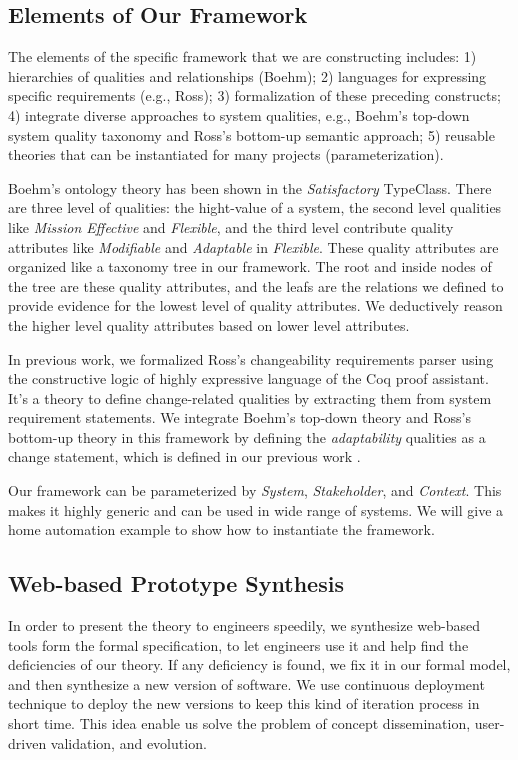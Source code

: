 \documentclass[conference]{IEEEtran}
\begin{document}
\subsection{Elements of Our Framework}
The elements of the specific framework that we are constructing includes: 1) hierarchies of qualities and relationships (Boehm); 2) languages for expressing specific requirements (e.g., Ross); 3) formalization of these preceding constructs; 4) integrate diverse approaches to system qualities, e.g., Boehm's top-down system quality taxonomy and Ross's bottom-up semantic approach; 5) reusable theories that can be instantiated for many projects (parameterization).

Boehm's ontology theory has been shown in the {\em Satisfactory} TypeClass. There are three level of qualities: the hight-value of a system, the second level qualities like \emph{Mission Effective} and \emph{Flexible}, and the third level contribute quality attributes like \emph{Modifiable} and \emph{Adaptable} in \emph{Flexible}. These quality attributes are organized like a taxonomy tree in our framework. The root and inside nodes of the tree are these quality attributes, and the leafs are the relations we defined to provide evidence for the lowest level of quality attributes. We deductively reason the higher level quality attributes based on lower level attributes.

In previous work, we formalized Ross's changeability requirements parser using the constructive logic of highly expressive language of the Coq proof assistant. It's a theory to define change-related qualities by extracting them from system requirement statements. We integrate Boehm's top-down theory and Ross's bottom-up theory in this framework by defining the {\em adaptability} qualities as a change statement, which is defined in our previous work \cite{Sullivan:evolutionary}.

Our framework can be parameterized by {\em System}, {\em Stakeholder}, and {\em Context}. This makes it highly generic and can be used in wide range of systems. We will give a home automation example to show how to instantiate the framework.

\subsection{Web-based Prototype Synthesis}
In order to present the theory to engineers speedily, we synthesize web-based tools form the formal specification, to let engineers use it and help find the deficiencies of our theory. If any deficiency is found, we fix it in our formal model, and then synthesize a new version of software. We use continuous deployment technique to deploy the new versions to keep this kind of iteration process in short time. This idea enable us solve the problem of concept dissemination, user-driven validation, and evolution.
\end{document}

